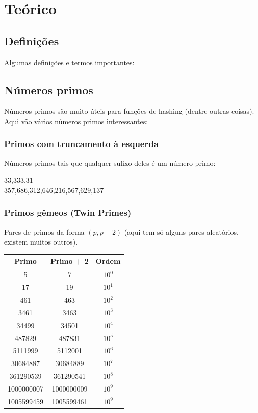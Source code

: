 \chapter{Teórico}


\section {Definições}

Algumas definições e termos importantes:

\section{Números primos}

Números primos são muito úteis para funções de hashing (dentre outras coisas). Aqui vão vários números primos interessantes:


\subsection{Primos com truncamento à esquerda}

Números primos tais que qualquer sufixo deles é um número primo:

\begin{center}
\LARGE
33,333,31 \\
\LARGE
357,686,312,646,216,567,629,137
\end{center}


\subsection{Primos gêmeos (Twin Primes)}

Pares de primos da forma $(p, p + 2)$ (aqui tem só alguns pares aleatórios, existem muitos outros).

\begin{table}[h]
  \centering
  \begin{tabular}{|c|c|c|}
    \hline
    \textbf{Primo} & \textbf{Primo + 2} & \textbf{Ordem} \\
    \hline
    5 & 7 & $10^0$ \\
    \hline
    17 & 19 & $10^1$ \\
    \hline
    461 & 463 & $10^2$ \\
    \hline
    3461 & 3463 & $10^3$ \\
    \hline
    34499 & 34501 & $10^4$ \\
    \hline
    487829 & 487831 & $10^5$ \\
    \hline
    5111999 & 5112001 & $10^6$ \\
    \hline
    30684887 & 30684889 & $10^7$ \\
    \hline
    361290539 & 361290541 & $10^8$ \\
    \hline
    1000000007 & 1000000009 & $10^9$ \\
    \hline
    1005599459 & 1005599461 & $10^9$ \\
    \hline
  \end{tabular}
\end{table}



